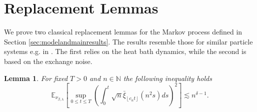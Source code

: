 \documentclass[a4paper, reqno, 12pt]{amsart}
\theoremstyle{plain}
\newtheorem{lemma}[definition]{Lemma}
\theoremstyle{definition}
\newcommand{\floor}[1]{\left\lfloor #1 \right\rfloor}
\newcommand{\ee}[1]{\mathbb{E}_{\nu_{\beta,\lambda}}\left[ #1 \right]}
\newcommand{\N}{\mathbb{N}}
\begin{document}
\section{Replacement Lemmas} \label{sec:replacementlemmas}

We prove two classical replacement lemmas for the Markov process defined in Section \ref{sec:modelandmainresults}.  The results resemble those for similar particle systems e.g. in \cite[Section 6]{BGJS22}. The first relies on the heat bath dynamics, while the second is based on the exchange noise.

\begin{lemma}\label{lem:boundaryreplacement}
For fixed $T>0$ and $n\in\N$ the following inequality holds
\begin{equation*}
    \ee{ \sup_{0\leq t\leq T} \left(\int_0^t \sqrt{n} \bar\xi_{\floor{c_n t}}(n^2s) ds \right)^2 } \lesssim n^{\delta -1}.
\end{equation*}
\end{lemma}
\end{document}
